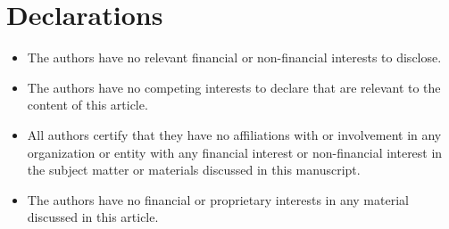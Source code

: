 \documentclass[12pt,reqno,openbib,runningheads,a4paper,portrait]{amsart}%
\begin{document}
\section{\textbf{Declarations}}

\begin{itemize}
\item The authors have no relevant financial or non-financial interests to disclose.

\item The authors have no competing interests to declare that are relevant to
the content of this article.

\item All authors certify that they have no affiliations with or involvement
in any organization or entity with any financial interest or non-financial
interest in the subject matter or materials discussed in this manuscript.

\item The authors have no financial or proprietary interests in any material
discussed in this article.
\end{itemize}
\end{document}
